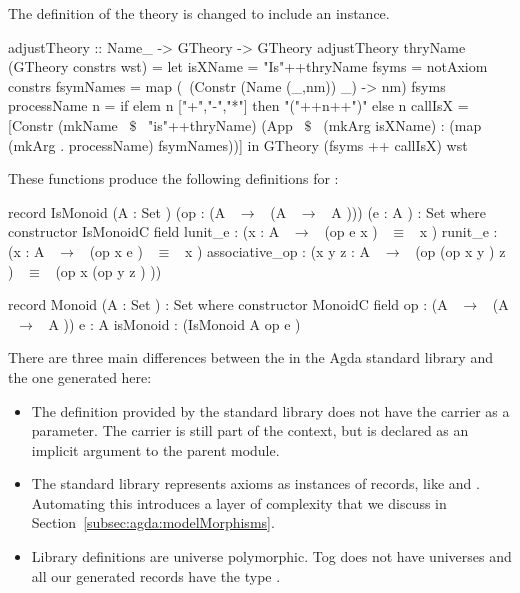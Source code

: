 The definition of the theory \lstmath{$\Gamma$} is changed to include an  instance.  
\begin{hscode}
adjustTheory :: Name_ -> GTheory -> GTheory
adjustTheory thryName (GTheory constrs wst) =
  let isXName = "Is"++thryName
      fsyms = notAxiom constrs
      fsymNames = map (\ (Constr (Name (_,nm)) _) -> nm) fsyms
      processName n = if elem n ["+","-","*"] then "("++n++")" else n 
      callIsX = [Constr (mkName ~$\$$~ "is"++thryName)
                     (App ~$\$$~ (mkArg isXName) 
                          : (map (mkArg . processName) fsymNames))]
  in GTheory (fsyms ++ callIsX) wst 
\end{hscode} 
These functions produce the following definitions for : 
\begin{agdacode}
record IsMonoid (A  : Set ) (op  : (A  ~$\to$~ (A ~$\to$~ A ))) (e  : A ) 
                : Set where
  constructor IsMonoidC
  field
   lunit_e : ({x  : A }  ~$\to$~ (op e x ) ~$\equiv$~ x )
   runit_e : ({x  : A }  ~$\to$~ (op x e ) ~$\equiv$~ x )
   associative_op : ({x y z  : A }  ~$\to$~ 
            (op (op x y ) z ) ~$\equiv$~ (op x (op y z ) )) 

record Monoid (A  : Set )  : Set where
  constructor MonoidC
  field
   op : (A  ~$\to$~ (A  ~$\to$~ A ))
   e : A 
   isMonoid : (IsMonoid A op e ) 
\end{agdacode}
There are three main differences between the  in the Agda standard library and the one generated here: 
\begin{itemize}
\item The definition provided by the standard library does not have the carrier as a parameter. The carrier is still part of the context, but is declared as an implicit argument to the parent module. 
\item The standard library represents axioms as instances of records, like  and . Automating this introduces a layer of complexity that we discuss in Section~\ref{subsec:agda:modelMorphisms}. 
\item Library definitions are universe polymorphic. Tog does not have universes and all our generated records have the type . 
\end{itemize} 

